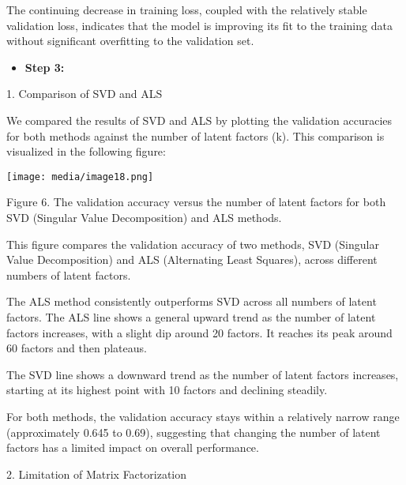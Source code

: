 The continuing decrease in training loss, coupled with the relatively
stable validation loss, indicates that the model is improving its fit to
the training data without significant overfitting to the validation set.

\begin{itemize}
\item
  \textbf{Step 3:}
\end{itemize}

1. Comparison of SVD and ALS

We compared the results of SVD and ALS by plotting the validation
accuracies for both methods against the number of latent factors (k).
This comparison is visualized in the following figure:

\texttt{[image: media/image18.png]}

Figure 6. The validation accuracy versus the number of latent factors
for both SVD (Singular Value Decomposition) and ALS methods.

This figure compares the validation accuracy of two methods, SVD
(Singular Value Decomposition) and ALS (Alternating Least Squares),
across different numbers of latent factors.

The ALS method consistently outperforms SVD across all numbers of latent
factors. The ALS line shows a general upward trend as the number of
latent factors increases, with a slight dip around 20 factors. It
reaches its peak around 60 factors and then plateaus.

The SVD line shows a downward trend as the number of latent factors
increases, starting at its highest point with 10 factors and declining
steadily.

For both methods, the validation accuracy stays within a relatively
narrow range (approximately 0.645 to 0.69), suggesting that changing the
number of latent factors has a limited impact on overall performance.

2. Limitation of Matrix Factorization

